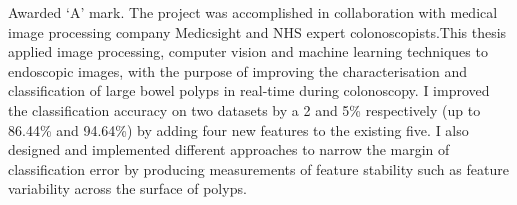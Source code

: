 Awarded `A' mark. The project was accomplished in collaboration with medical image processing company Medicsight and NHS expert colonoscopists.This thesis applied image processing, computer vision and machine learning techniques to endoscopic images, with the purpose of improving the characterisation and classification of large bowel polyps in real-time during colonoscopy.
I improved the classification accuracy on two datasets by a 2 and 5\% respectively (up to 86.44\% and 94.64\%) by adding four new features to the existing five.
I also designed and implemented different approaches to narrow the margin of classification error by producing measurements of feature stability such as feature variability across the surface of polyps.
